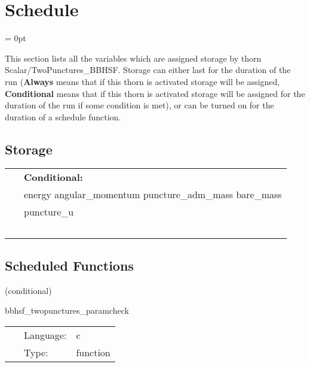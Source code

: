 
\section{Schedule} 


\parskip = 0pt


\noindent This section lists all the variables which are assigned storage by thorn Scalar/TwoPunctures\_BBHSF.  Storage can either last for the duration of the run ({\bf Always} means that if this thorn is activated storage will be assigned, {\bf Conditional} means that if this thorn is activated storage will be assigned for the duration of the run if some condition is met), or can be turned on for the duration of a schedule function.


\subsection*{Storage}

\hspace{5mm}

 \begin{tabular*}{160mm}{ll} 
~& {\bf Conditional:} \\ 
~ &  energy angular\_momentum puncture\_adm\_mass bare\_mass\\ 
~ &  puncture\_u\\ 
~ & ~\\ 
\end{tabular*} 


\subsection*{Scheduled Functions}
\vspace{5mm}

   (conditional) 

\hspace{5mm} bbhsf\_twopunctures\_paramcheck 

\hspace{5mm}{\it check parameters and thorn needs } 


\hspace{5mm}

 \begin{tabular*}{160mm}{cll} 
~ & Language:  & c \\ 
~ & Type:  & function \\ 
\end{tabular*} 


\vspace{5mm}

